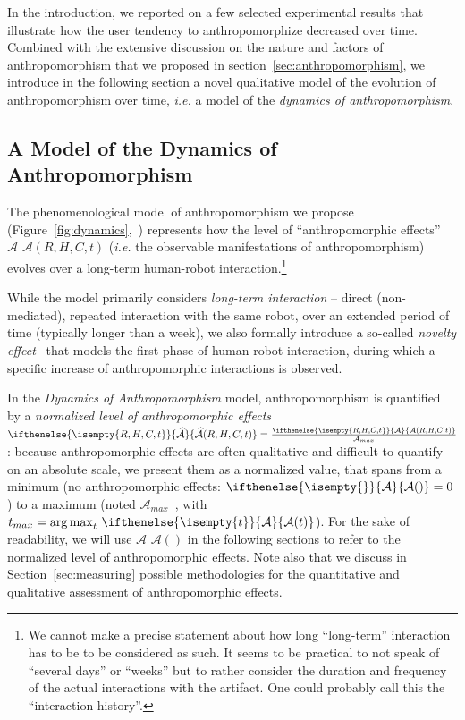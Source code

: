 \documentclass{frontiersSCNS} %
\newcommand{\ie}{\textit{i.e.}\xspace}
\newcommand{\Ant}[1][]{%
      \ifthenelse{\isempty{#1}}%
        {$\mathcal{A}$}
        {$\mathcal{A}(#1)$}
}
\newcommand{\ant}[1][]{%
      \ifthenelse{\isempty{#1}}%
        {\mathcal{A}}
        {\mathcal{A}(#1)}
}
\newcommand{\antNorm}[1][]{%
      \ifthenelse{\isempty{#1}}%
      {\widehat{\mathcal{A}}}
      {\widehat{\mathcal{A}}(#1)}
}
\newcommand{\AntMax}{{$\mathcal{A}_{max}$~}}
\newcommand{\antMax}{{\mathcal{A}_{max}}}
\begin{document}
In the introduction, we reported on a few selected experimental results that
illustrate how the user tendency to anthropomorphize decreased over time.
Combined with the extensive discussion on the nature and factors of
anthropomorphism that we proposed in section~\ref{sec:anthropomorphism}, we
introduce in the following section a novel qualitative model of the evolution of
anthropomorphism over time, \ie a model of the \emph{dynamics of
anthropomorphism}.


\subsection{A Model of the Dynamics of Anthropomorphism}
\label{sec:dynamics-model}

The phenomenological model of anthropomorphism we propose
(Figure~\ref{fig:dynamics},~\citep{lemaignan2014dynamics}) represents how the
level of ``anthropomorphic effects''~\Ant[R,H,C,t] (\ie the observable
manifestations of anthropomorphism) evolves over a long-term human-robot
interaction.\footnote{We cannot make a precise statement about how long
``long-term'' interaction has to be to be considered as such. It seems to be
practical to not speak of ``several days'' or ``weeks'' but to rather consider
the duration and frequency of the actual interactions with the artifact. One
could probably call this the ``interaction history''.}

While the model primarily considers \emph{long-term interaction} -- direct
(non-mediated), repeated interaction with the same robot, over an extended
period of time (typically longer than a week), we also formally introduce a
so-called \emph{novelty effect}~\citep{kanda_interactive_2004} that models the
first phase of human-robot interaction, during which a specific increase of
anthropomorphic interactions is observed.

In the \emph{Dynamics of Anthropomorphism} model, anthropomorphism is quantified
by a \emph{normalized level of anthropomorphic effects} $\antNorm[R,H,C,t] =
\frac{\ant[R,H,C,t]}{\antMax}$: because anthropomorphic effects are often
qualitative and difficult to quantify on an absolute scale, we present them as a
normalized value, that spans from a minimum (no anthropomorphic effects:
$\ant=0$) to a maximum (noted \AntMax, with $t_{max} = \operatorname{arg\,max}_t
\, \ant[t]$). For the sake of readability, we will use \Ant in the following
sections to refer to the normalized level of anthropomorphic effects. Note also
that we discuss in Section~\ref{sec:measuring} possible methodologies for the
quantitative and qualitative assessment of anthropomorphic effects.
\end{document}
